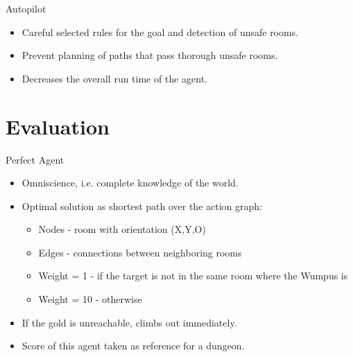 \documentclass[smaller,dvipsnames,ratio=169]{beamer}
\begin{document}
  \begin{frame}{Autopilot}
  	\begin{itemize}
  		\item Careful selected rules for the goal and detection of unsafe rooms.
  		\item Prevent planning of paths that pass thorough unsafe rooms.		  		
		\item Decreases the overall run time of the agent.

  	\end{itemize}
  	
  \end{frame}


  \section{Evaluation}
  
  \begin{frame}{Perfect Agent}
    
    \begin{itemize}
      \item Omniscience, i.e. complete knowledge of the world. 
      \item Optimal solution as shortest path over the action graph:
      \begin{itemize}
      	\item Nodes - room with orientation (X,Y,O)
      	\item Edges - connections between neighboring rooms
      	\item Weight = 1 - if the target is not in the same room where the Wumpus is 
      	\item Weight = 10 - otherwise
      \end{itemize}
	  \item If the gold is unreachable, climbs out immediately.
      \item Score of this agent taken as reference for a dungeon.
    \end{itemize}
  \end{frame}
\end{document}
